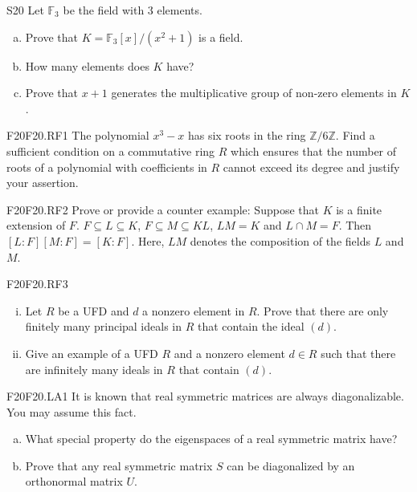 \documentclass{article}
\newcommand{\Z}{\mathbb{Z}}
\newcommand{\F}{\mathbb{F}}
\newcommand{\sq}{\subseteq}
\theoremstyle{definition}
\begin{document}
	\begin{prob}{S20}{}
	Let $\F_3$ be the field with 3 elements.
	\begin{enumerate}[(a)]
	\item Prove that $K = \F_3[x]/(x^2 + 1)$ is a field.
	\item How many elements does $K$ have?
	\item Prove that $x+1$ generates the multiplicative group of non-zero elements in $K$.
	\end{enumerate}
	\end{prob}

	
	\begin{prob}{F20}{F20.RF1}
	The polynomial $x^3 - x$ has six roots in the ring $\Z/6\Z$. Find a sufficient condition on a commutative ring $R$ which ensures that the number of roots of a polynomial with coefficients in $R$ cannot exceed its degree and justify your assertion.
	\end{prob}
	
	\begin{prob}{F20}{F20.RF2}
	Prove or provide a counter example: Suppose that $K$ is a finite extension of $F$. $F \sq L \sq K$, $F \sq M \sq KL$, $LM = K$ and $L \cap M = F$. Then $[L:F][M:F] = [K:F]$. Here, $LM$ denotes the composition of the fields $L$ and $M$.
	\end{prob}
	
	\begin{prob}{F20}{F20.RF3}
		\begin{enumerate}[(i)]
		\item Let $R$ be a UFD and $d$ a nonzero element in $R$. Prove that there are only finitely many principal ideals  in $R$ that contain the ideal $(d)$.
		\item Give an example of a UFD $R$ and a nonzero element $d \in R$ such that there are infinitely many ideals in $R$ that contain $(d)$.
		\end{enumerate}
	\end{prob}
	
	\begin{prob}{F20}{F20.LA1}
	It is known that real symmetric matrices are always diagonalizable. You may assume this fact.
	\begin{enumerate}[(a)]
	\item What special property do the eigenspaces of a real symmetric matrix have?
	\item Prove that any real symmetric matrix $S$ can be diagonalized by an orthonormal matrix $U$.
	\end{enumerate}
	\end{prob}
	
\end{document}
